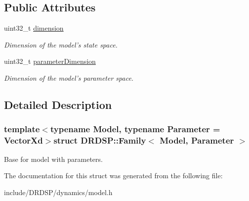 \subsection*{Public Attributes}
\begin{DoxyCompactItemize}
\item 
\hypertarget{struct_d_r_d_s_p_1_1_family_aa54977acd7a397ddd32ed2eaf0d003af}{uint32\-\_\-t \hyperlink{struct_d_r_d_s_p_1_1_family_aa54977acd7a397ddd32ed2eaf0d003af}{dimension}}\label{struct_d_r_d_s_p_1_1_family_aa54977acd7a397ddd32ed2eaf0d003af}

\begin{DoxyCompactList}\small\item\em Dimension of the model's state space. \end{DoxyCompactList}\item 
\hypertarget{struct_d_r_d_s_p_1_1_family_a2732d95d26fc585e2ddee3b303706ae3}{uint32\-\_\-t \hyperlink{struct_d_r_d_s_p_1_1_family_a2732d95d26fc585e2ddee3b303706ae3}{parameter\-Dimension}}\label{struct_d_r_d_s_p_1_1_family_a2732d95d26fc585e2ddee3b303706ae3}

\begin{DoxyCompactList}\small\item\em Dimension of the model's parameter space. \end{DoxyCompactList}\end{DoxyCompactItemize}


\subsection{Detailed Description}
\subsubsection*{template$<$typename Model, typename Parameter = Vector\-Xd$>$struct D\-R\-D\-S\-P\-::\-Family$<$ Model, Parameter $>$}

Base for model with parameters. 

The documentation for this struct was generated from the following file\-:\begin{DoxyCompactItemize}
\item 
include/\-D\-R\-D\-S\-P/dynamics/model.\-h\end{DoxyCompactItemize}
